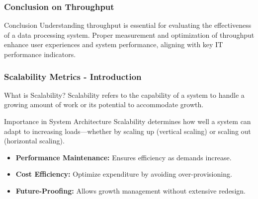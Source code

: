 \documentclass[aspectratio=169]{beamer}
\begin{document}
\begin{frame}[fragile]
    \frametitle{Conclusion on Throughput}
    \begin{block}{Conclusion}
        Understanding throughput is essential for evaluating the effectiveness of a data processing system. 
        Proper measurement and optimization of throughput enhance user experiences and system performance, aligning with key IT performance indicators.
    \end{block}
\end{frame}

\begin{frame}[fragile]
    \frametitle{Scalability Metrics - Introduction}
    \begin{block}{What is Scalability?}
        Scalability refers to the capability of a system to handle a growing amount of work or its potential to accommodate growth. 
    \end{block}
    \begin{block}{Importance in System Architecture}
        Scalability determines how well a system can adapt to increasing loads—whether by scaling up (vertical scaling) or scaling out (horizontal scaling).
    \end{block}
    \begin{itemize}
        \item \textbf{Performance Maintenance:} Ensures efficiency as demands increase.
        \item \textbf{Cost Efficiency:} Optimize expenditure by avoiding over-provisioning.
        \item \textbf{Future-Proofing:} Allows growth management without extensive redesign.
    \end{itemize}
\end{frame}
\end{document}
